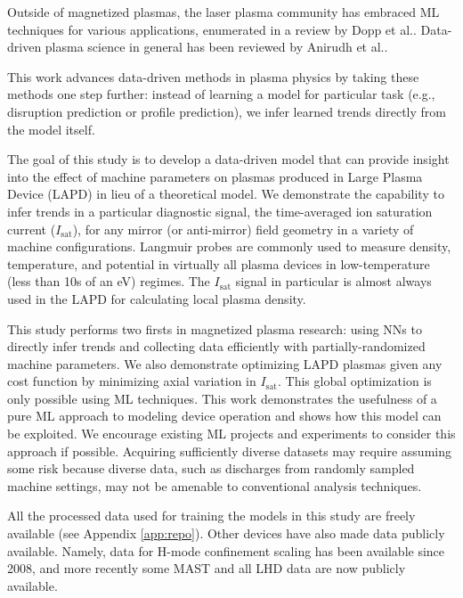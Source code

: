 Outside of magnetized plasmas, the laser plasma community has embraced ML techniques for various applications, enumerated in a review by Dopp et al.\cite{dopp_data-driven_2023}. Data-driven plasma science in general has been reviewed by Anirudh et al.\cite{anirudh_2022_2023}.

This work advances data-driven methods in plasma physics by taking these methods one step further: instead of learning a model for particular task (e.g., disruption prediction or profile prediction), we infer learned trends directly from the model itself. 

The goal of this study is to develop a data-driven model that can provide insight into the effect of machine parameters on plasmas produced in Large Plasma Device (LAPD) in lieu of a theoretical model. We demonstrate the capability to infer trends in a particular diagnostic signal, the time-averaged ion saturation current ($I_\text{sat}$), for any mirror (or anti-mirror) field geometry in a variety of machine configurations. Langmuir probes are commonly used to measure density, temperature, and potential in virtually all plasma devices in low-temperature (less than 10s of an eV) regimes. The $I_\text{sat}$ signal in particular is almost always used in the LAPD for calculating local plasma density.

This study performs two firsts in magnetized plasma research: using NNs to directly infer trends and collecting data efficiently with partially-randomized machine parameters. We also demonstrate optimizing LAPD plasmas given any cost function by minimizing axial variation in $I_\text{sat}$. This global optimization is only possible using ML techniques. This work demonstrates the usefulness of a pure ML approach to modeling device operation and shows how this model can be exploited. We encourage existing ML projects and experiments to consider this approach if possible. Acquiring sufficiently diverse datasets may require assuming some risk because diverse data, such as discharges from randomly sampled machine settings, may not be amenable to conventional analysis techniques.

%
All the processed data used for training the models in this study are freely available\cite{phil_travis_2025_15007853} (see Appendix \ref{app:repo}). Other devices have also made data publicly available. Namely, data for H-mode confinement scaling has been available since 2008\cite{roach_2008_2008}, and more recently some MAST\cite{jackson_fair-mast_2024} and all LHD\cite{lhd_data} data are now publicly available.  

